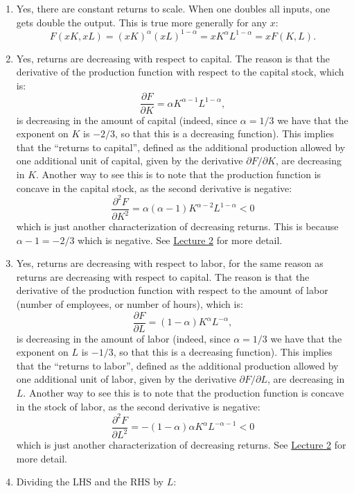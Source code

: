\documentclass[]{book}
\theoremstyle{definition}
\theoremstyle{definition}
\theoremstyle{definition}
\theoremstyle{remark}
\begin{document}
\begin{enumerate}
\def\labelenumi{\arabic{enumi}.}
\item
  Yes, there are constant returns to scale. When one doubles all inputs,
  one gets double the output. This is true more generally for any \(x\):
  \[F(xK,xL)=(xK)^\alpha (xL)^{1-\alpha} = x K^\alpha L^{1-\alpha}= x F(K,L).\]
\item
  Yes, returns are decreasing with respect to capital. The reason is
  that the derivative of the production function with respect to the
  capital stock, which is:
  \[\frac{\partial F}{\partial K}=\alpha K^{\alpha-1} L^{1-\alpha},\] is
  decreasing in the amount of capital (indeed, since \(\alpha=1/3\) we
  have that the exponent on \(K\) is \(-2/3\), so that this is a
  decreasing function). This implies that the ``returns to capital'',
  defined as the additional production allowed by one additional unit of
  capital, given by the derivative \(\partial F/\partial K\), are
  decreasing in \(K\). Another way to see this is to note that the
  production function is concave in the capital stock, as the second
  derivative is negative:
  \[\frac{\partial^2 F}{\partial K^2}=\alpha (\alpha-1) K^{\alpha-2} L^{1-\alpha}<0\]
  which is just another characterization of decreasing returns. This is
  because \(\alpha-1=-2/3\) which is negative. See
  \href{lecture2.html}{Lecture 2} for more detail.
\item
  Yes, returns are decreasing with respect to labor, for the same reason
  as returns are decreasing with respect to capital. The reason is that
  the derivative of the production function with respect to the amount
  of labor (number of employees, or number of hours), which is:
  \[\frac{\partial F}{\partial L}=(1-\alpha) K^{\alpha} L^{-\alpha},\]
  is decreasing in the amount of labor (indeed, since \(\alpha=1/3\) we
  have that the exponent on \(L\) is \(-1/3\), so that this is a
  decreasing function). This implies that the ``returns to labor'',
  defined as the additional production allowed by one additional unit of
  labor, given by the derivative \(\partial F/\partial L\), are
  decreasing in \(L\). Another way to see this is to note that the
  production function is concave in the stock of labor, as the second
  derivative is negative:
  \[\frac{\partial^2 F}{\partial L^2}=-(1-\alpha)\alpha K^{\alpha} L^{-\alpha-1}<0\]
  which is just another characterization of decreasing returns. See
  \href{lecture2.html}{Lecture 2} for more detail.
\item
  Dividing the LHS and the RHS by \(L\):

\end{enumerate}
\end{document}
